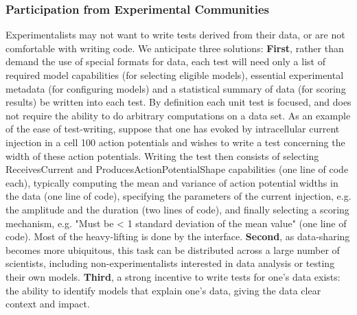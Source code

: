 \documentclass[a4paper,12pt]{article}
\begin{document}
\subsubsection{Participation from Experimental Communities}
Experimentalists may not want to write tests derived from their data, or are not comfortable with writing code.  We anticipate three solutions: \textbf{First}, rather than demand the use of special formats for data, each test will need only a list of required model capabilities (for selecting eligible models), essential experimental metadata (for configuring models) and a statistical summary of data (for scoring results) be written into each test.  By definition each unit test is focused, and does not require the ability to do arbitrary computations on a data set.  As an example of the ease of test-writing, suppose that one has evoked by intracellular current injection in a cell 100 action potentials and wishes to write a test concerning the width of these action potentials.  Writing the test then consists of selecting ReceivesCurrent and ProducesActionPotentialShape capabilities (one line of code each), typically computing the mean and variance of action potential widths in the data (one line of code), specifying the parameters of the current injection, e.g. the amplitude and the duration (two lines of code), and finally selecting a scoring mechanism, e.g. "Must be < 1 standard deviation of the mean value" (one line of code).  Most of the heavy-lifting is done by the interface.  \textbf{Second}, as data-sharing becomes more ubiquitous, this task can be distributed across a large number of scientists, including non-experimentalists interested in data analysis or testing their own models.  \textbf{Third}, a strong incentive to write tests for one's data exists: the ability to identify models that explain one's data, giving the data clear context and impact. 
\end{document}
